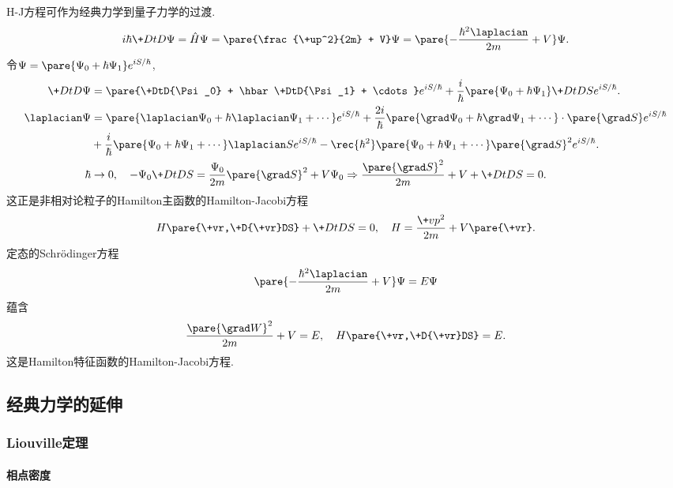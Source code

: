 \documentclass{ctexart}
\begin{document}
H-J方程可作为经典力学到量子力学的过渡.
\[ i\hbar \+DtD\Psi = \hat H \Psi = \pare{\frac{\+up^2}{2m} + V}\Psi = \pare{-\frac{\hbar^2 \laplacian}{2m} + V}\Psi. \]
令$\displaystyle \Psi = \pare{\Psi_0 + \hbar \Psi_1} e^{iS/\hbar}$,
\begin{align*}
    \+DtD\Psi &= \pare{\+DtD{\Psi_0} + \hbar \+DtD{\Psi_1} + \cdots} e^{iS/\hbar} + \frac{i}{\hbar} \pare{\Psi_0 + \hbar \Psi_1} \+DtDS e^{iS/\hbar}. \\
    \laplacian \Psi &= \pare{\laplacian \Psi_0 + \hbar\laplacian \Psi_1 + \cdots} e^{iS/\hbar} + \frac{2i}{\hbar}\pare{\grad \Psi_0 + \hbar \grad \Psi_1 + \cdots} \cdot \pare{\grad S} e^{iS/\hbar} \\
    &+ \frac{i}{\hbar}\pare{\Psi_0 + \hbar\Psi_1 + \cdots} \laplacian S e^{iS/\hbar} - \rec{\hbar^2}\pare{\Psi_0 + \hbar\Psi_1 + \cdots}\pare{\grad S}^2 e^{iS/\hbar}. \\
    \hbar & \rightarrow 0,\quad -\Psi_0 \+DtDS = \frac{\Psi_0}{2m}\pare{\grad S}^2 + V\Psi_0 \Rightarrow \frac{\pare{\grad S}^2}{2m} + V + \+DtDS = 0.
\end{align*}
这正是非相对论粒子的Hamilton主函数的Hamilton-Jacobi方程
\[ H\pare{\+vr,\+D{\+vr}DS} + \+DtDS = 0,\quad H = \frac{\+vp^2}{2m} + V\pare{\+vr}. \]
定态的Schr\"odinger方程
\[ \pare{-\frac{\hbar^2\laplacian}{2m} + V}\Psi = E\Psi \]
蕴含
\[ \frac{\pare{\grad W}^2}{2m} + V = E,\quad H\pare{\+vr,\+D{\+vr}DS} = E. \]
这是Hamilton特征函数的Hamilton-Jacobi方程.




\subsection{经典力学的延伸} %
\label{sub:经典力学的延伸}

\subsubsection{Liouville定理} %
\label{ssub:liouville定理}

\paragraph{相点密度} %
\label{par:相点密度}
\end{document}
